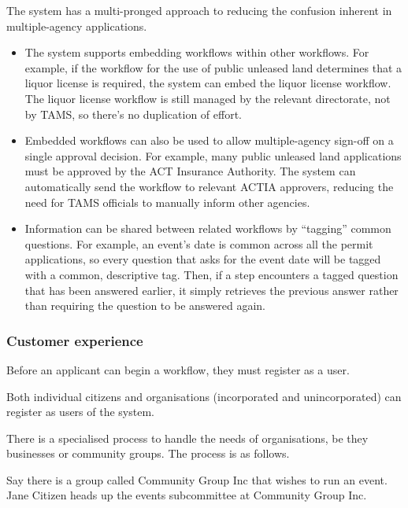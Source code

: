 \documentclass[12pt,a4paper,twosided]{article}
\begin{document}
The system has a multi-pronged approach to reducing the confusion inherent in multiple-agency applications.
\begin{itemize}
\item The system supports embedding workflows within other workflows. For example, if the workflow for the use of public unleased land determines that a liquor license is required, the system can embed the liquor license workflow. The liquor license workflow is still managed by the relevant directorate, not by TAMS, so there's no duplication of effort.
\item Embedded workflows can also be used to allow multiple-agency sign-off on a single approval decision. For example, many public unleased land applications must be approved by the ACT Insurance Authority. The system can automatically send the workflow to relevant ACTIA approvers, reducing the need for TAMS officials to manually inform other agencies.
\item Information can be shared between related workflows by ``tagging'' common questions. For example, an event's date is common across all the permit applications, so every question that asks for the event date will be tagged with a common, descriptive tag. Then, if a step encounters a tagged question that has been answered earlier, it simply retrieves the previous answer rather than requiring the question to be answered again.
\end{itemize}

\subsubsection{Customer experience}

Before an applicant can begin a workflow, they must register as a user.

Both individual citizens and organisations (incorporated and unincorporated)
can register as users of the system.

There is a specialised process to handle the needs of organisations, be they businesses or community groups. The process is as follows.

Say there is a group called Community Group Inc that wishes to run an event. Jane Citizen heads up the events subcommittee at Community Group Inc.
\end{document}
